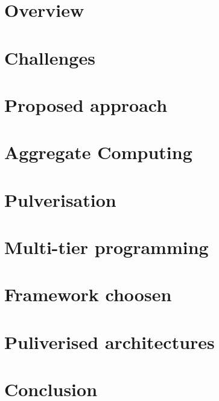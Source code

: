\documentclass[aspectratio=169, 9pt]{beamer}
\begin{document}


\section{Overview}


\section{Challenges}


\section{Proposed approach}


\section{Aggregate Computing}


\section{Pulverisation}


\section{Multi-tier programming}


\section{Framework choosen}


\section{Puliverised architectures}




\section{Conclusion}



\end{document}
